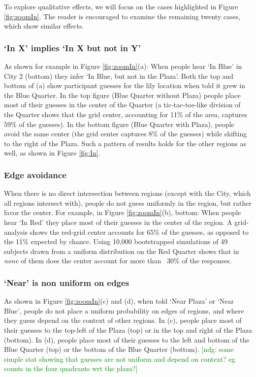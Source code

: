 \documentclass[10pt,letterpaper]{article}
\newcommand{\ndg}[1]{\textcolor{Green}{[ndg: #1]}}
\begin{document}
To explore qualitative effects, we will focus on the cases highlighted in Figure \ref{fig:zoomIn}. The reader is encouraged to examine the remaining twenty cases, which show similar effects. 


\subsubsection{`In X' implies `In X but not in Y'} As shown for example in Figure \ref{fig:zoomIn}(a): When people hear `In Blue' in City 2 (bottom) they infer `In Blue, but not in the Plaza'. Both the top and bottom of (a) show participant guesses for the lily location when told it grew in the Blue Quarter. In the top figure (Blue Quarter without Plaza) people place most of their guesses in the center of the Quarter (a tic-tac-toe-like division of the Quarter shows that the grid center, accounting for 11\% of the area, captures 59\% of the guesses). In the bottom figure (Blue Quarter with Plaza), people avoid the same center (the grid center captures 8\% of the guesses) while shifting to the right of the Plaza. Such a pattern of results holds for the other regions as well, as shown in Figure \ref{fig:In}. 

\subsubsection{Edge avoidance} When there is no direct intersection between regions (except with the City, which all regions intersect with), people do not guess uniformly in the region, but rather favor the center. For example, in Figure \ref{fig:zoomIn}(b), bottom: When people hear `In Red' they place most of their guesses in the center of the region. A grid-analysis shows the red-grid center accounts for 65\% of the guesses, as opposed to the 11\% expected by chance. Using 10,000 bootstrapped simulations of 49 subjects drawn from a uniform distribution on the Red Quarter shows that in \textit{none} of them does the center account for more than ~30\% of the responses. 

\subsubsection{`Near' is non uniform on edges} As shown in Figure \ref{fig:zoomIn}(c) and (d), when told `Near Plaza' or `Near Blue', people do not place a uniform probability on edges of regions, and where they guess depend on the context of other regions.
In (c), people place most of their guesses to the top-left of the Plaza (top) or in the top and right of the Plaza (bottom). In (d), people place most of their guesses to the left and bottom of the Blue Quarter (top) or the bottom of the Blue Quarter (bottom). 
\ndg{some simple stat showing that guesses are not uniform and depend on context? eg counts in the four quadrants wrt the plaza?}
\end{document}
